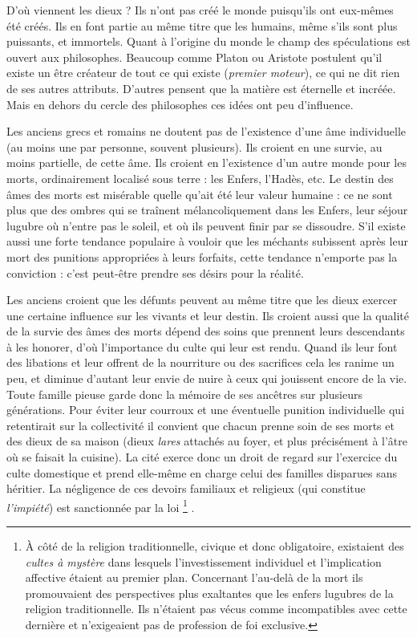  D'où viennent les dieux ? Ils n'ont pas créé le monde puisqu'ils ont eux-mêmes été créés. Ils en font partie au même titre que les humains, même s'ils sont plus puissants, et immortels. Quant à l'origine du monde le champ des spéculations est ouvert aux philosophes. Beaucoup comme Platon ou Aristote postulent qu'il existe un être créateur de tout ce qui existe (\emph{premier moteur}), ce qui ne dit rien de ses autres attributs. D'autres pensent que la matière est éternelle et incréée. Mais en dehors du cercle des philosophes ces idées ont peu d'influence. 

 Les anciens grecs et romains ne doutent pas de l'existence d'une âme individuelle (au moins une par personne, souvent plusieurs). Ils croient en une survie, au moins partielle, de cette âme. Ils croient en l'existence d'un autre monde pour les morts, ordinairement localisé sous terre : les Enfers, l'Hadès, etc. Le destin des âmes des morts est misérable quelle qu'ait été leur valeur humaine : ce ne sont plus que des ombres qui se traînent mélancoliquement dans les Enfers, leur séjour lugubre où n'entre pas le soleil, et où ils peuvent finir par se dissoudre. S'il existe aussi une forte tendance populaire à vouloir que les méchants subissent après leur mort des punitions appropriées à leurs forfaits, cette tendance n'emporte pas la conviction : c'est peut-être prendre ses désirs pour la réalité.

 Les anciens croient que les défunts peuvent au même titre que les dieux exercer une certaine influence sur les vivants et leur destin. Ils croient aussi que la qualité de la survie des âmes des morts dépend des soins que prennent leurs descendants à les honorer, d'où l'importance du culte qui leur est rendu. Quand ils leur font des libations et leur offrent de la nourriture ou des sacrifices cela les ranime un peu, et diminue d'autant leur envie de nuire à ceux qui jouissent encore de la vie. Toute famille pieuse garde donc la mémoire de ses ancêtres sur plusieurs générations. Pour éviter leur courroux et une éventuelle punition individuelle qui retentirait sur la collectivité il convient que chacun prenne soin de ses morts et des dieux de sa maison (dieux \emph{lares} attachés au foyer, et plus précisément à l'âtre où se faisait la cuisine). La cité exerce donc un droit de regard sur l'exercice du culte domestique et prend elle-même en charge celui des familles disparues sans héritier. La négligence de ces devoirs familiaux et religieux (qui constitue \emph{l'impiété}) est sanctionnée par la loi%
\footnote{À côté de la religion traditionnelle, civique et donc obligatoire, existaient des \emph{cultes à mystère} dans lesquels l'investissement individuel et l'implication affective étaient au premier plan. Concernant l'au-delà de la mort ils promouvaient des perspectives plus exaltantes que les enfers lugubres de la religion traditionnelle. Ils n'étaient pas vécus comme incompatibles avec cette dernière et n'exigeaient pas de profession de foi exclusive.}%
. 


